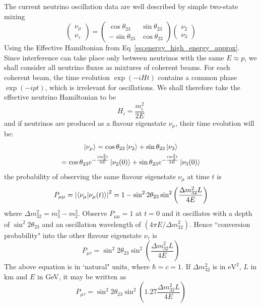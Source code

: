 The current neutrino oscillation data are well described by simple two-state mixing
\begin{equation}
    \begin{pmatrix}\nu _\mu \\ \nu _\tau\end{pmatrix} = \begin{pmatrix}
        \cos \theta_{23} & \sin \theta_{23}\\
        -\sin \theta_{23} & \cos \theta_{23}
    \end{pmatrix}  \begin{pmatrix}
        \nu _2 \\ \nu _3
    \end{pmatrix}
\end{equation}
Using the Effective Hamiltonian from Eq~\ref{eq:energy_high_energy_approx}. Since interference can take place only between neutrinos with the same \(E \approx p\), we shall consider all neutrino fluxes as mixtures of coherent beams. For each coherent beam, the time evolution \(\exp (-iHt)\) contains a common phase \(\exp (-ipt)\), which is irrelevant for oscillations. We shall therefore take the effective neutrino Hamiltonian to be\cite{Dighe}
\begin{equation}
    H_i = \frac{m_i^2}{2E}
\end{equation}
and if neutrinos are produced as a flavour eigenstate \(\nu_\mu\), their time evolution will be:
\begin{equation}
    \begin{gathered}
    \ket{\nu _\mu} = \cos \theta_{23}\ket{\nu _2} + \sin \theta_{23}\ket{\nu _3}\\
     = \cos \theta_{23}e^{- \frac{im_2 ^2 t}{2E}}\ket{\nu _2(0)} + \sin \theta_{23}e^{- \frac{im_3 ^2 t}{2E}}\ket{\nu _3(0)}
    \end{gathered}
\end{equation}
the probability of observing the same flavour eigenstate \(\nu_\mu\) at time \(t\) is 
\begin{equation}
    P_{\mu\mu} = \abs{\braket{\nu_\mu}{\nu_\mu (t)}}^2 = 1 - \sin^2 2\theta_{23}\sin ^2 \left(\frac{\Delta m_{32}^2 L}{4E}\right)
\end{equation}
where \(\Delta m_{32}^2 = m_3 ^2 - m_{2} ^2\). Observe \(P_{\mu\mu} = 1\) at \(t = 0\) and it oscillates  with a depth of \(\sin ^2 2\theta_{23}\) and an oscillation wavelength of \((4\pi E/\Delta m_{32}^2)\).
Hence ``conversion probability" into the other flavour eigenstate \(\nu _\tau\) is 
\begin{equation}
    P_{\mu\tau} = \sin ^2 2 \theta_{23} \sin ^2 \left(\frac{\Delta m_{32}^2 L}{4E}\right)
\end{equation}
The above equation is in `natural" units, where  \(\hbar = c = 1\). If \(\Delta m^2 _{32}\) is in \(\mathrm{eV^2}\), \(L\) in km and \(E\) in GeV, it may be written as
\begin{equation}
    P_{\mu\tau} = \sin ^2 2 \theta_{23} \sin ^2 \left(1.27\frac{\Delta m_{32}^2 L}{4E}\right)
\end{equation}

